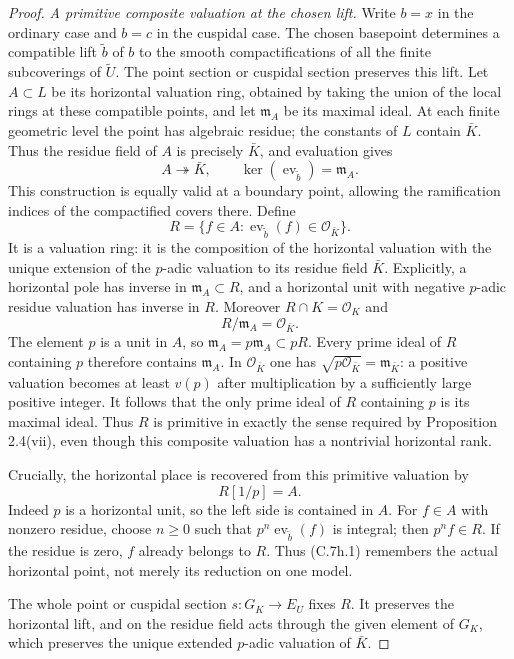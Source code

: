 \begin{proof}
\emph{A primitive composite valuation at the chosen lift.}
Write $b=x$ in the ordinary case and $b=c$ in the cuspidal case.
The chosen basepoint determines a compatible lift $\widetilde b$ of
$b$ to the smooth compactifications of all the finite subcoverings of
$\widetilde U$. The point section or cuspidal section preserves this
lift. Let $A\subset L$ be its horizontal valuation ring, obtained by
taking the union of the local rings at these compatible points, and let
$\mathfrak m_A$ be its maximal ideal. At each finite geometric level
the point has algebraic residue; the constants of $L$ contain $\bar K$.
Thus the residue field of $A$ is precisely $\bar K$, and evaluation gives
\[
 A\twoheadrightarrow\bar K,
 \qquad\ker(\operatorname{ev}_{\widetilde b})=\mathfrak m_A.
\]
This construction is equally valid at a boundary point, allowing the
ramification indices of the compactified covers there. Define
\[
 R=\{f\in A:\operatorname{ev}_{\widetilde b}(f)
                     \in\mathcal O_{\bar K}\}.
\]
It is a valuation ring: it is the composition of the horizontal valuation
with the unique extension of the $p$-adic valuation to its residue field
$\bar K$. Explicitly, a horizontal pole has inverse in
$\mathfrak m_A\subset R$, and a horizontal unit with negative
$p$-adic residue valuation has inverse in $R$. Moreover
$R\cap K=\mathcal O_K$ and
\[
 R/\mathfrak m_A=\mathcal O_{\bar K}.
\]
The element $p$ is a unit in $A$, so
$\mathfrak m_A=p\mathfrak m_A\subset pR$. Every prime ideal of $R$
containing $p$ therefore contains $\mathfrak m_A$. In
$\mathcal O_{\bar K}$ one has
$\sqrt{p\mathcal O_{\bar K}}=\mathfrak m_{\bar K}$: a positive
valuation becomes at least $v(p)$ after multiplication by a sufficiently
large positive integer. It follows that the only prime ideal of $R$
containing $p$ is its maximal ideal. Thus $R$ is primitive in exactly
the sense required by Proposition 2.4(vii), even though this composite
valuation has a nontrivial horizontal rank.

Crucially, the horizontal place is recovered from this primitive
valuation by
\[
 R[1/p]=A.                                                   \tag{C.7h.1}
\]
Indeed $p$ is a horizontal unit, so the left side is contained in $A$.
For $f\in A$ with nonzero residue, choose $n\ge0$ such that
$p^n\operatorname{ev}_{\widetilde b}(f)$ is integral; then $p^nf\in R$.
If the residue is zero, $f$ already belongs to $R$.
Thus (C.7h.1) remembers the actual horizontal point, not merely its
reduction on one model.

The whole point or cuspidal section $s:G_K\to E_U$ fixes $R$.
It preserves the horizontal lift, and on the residue field acts through
the given element of $G_K$, which preserves the unique extended
$p$-adic valuation of $\bar K$.


\end{proof}
